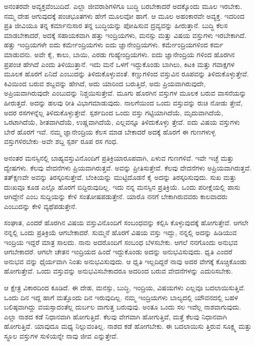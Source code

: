 ಅನಂತರವೇ ಅವ್ಯಕ್ತವೆಂಬುದಿದೆ. ಎಲ್ಲಾ ಜೀವರಾಶಿಗಳಿಗೂ ಬುದ್ಧಿ ಬರಬೇಕಾದರೆ ಅದಕ್ಕೊಂದು ಮೂಲ ಇರಬೇಕು. ನಮ್ಮ ದೇಹ ಆಗುವುದಕ್ಕೆ ಪಂಚಭೂತಗಳು ಹೇಗೆ ಮೂಲವೋ ಹಾಗೆ. ಆ ಮೂಲ ಅಹಂಕಾರವೇ ಅವ್ಯಕ್ತ. ಇದರಿಂದ ಪ್ರತಿ ಜೀವಿಯೂ ತನ್ನ ಕರ್ಮಾನುಸಾರ ತನ್ನ ಬುದ್ಧಿಯನ್ನು ಪೋಷಿಸುವ ದ್ರವ್ಯವನ್ನು ಹೀರುತ್ತಾನೆ. ಬುದ್ಧಿ ಕೆಲಸ ಮಾಡಬೇಕಾದರೆ, ಅದಕ್ಕೆ ಸಹಾಯಕವಾಗಿ ಹತ್ತು ಇಂದ್ರಿಯಗಳು, ಮನಸ್ಸು ಮತ್ತು ವಿಷಯ ವಸ್ತುಗಳು ಇರಬೇಕಾಗಿದೆ. ಹತ್ತು ಇಂದ್ರಿಯಗಳೇ ಐದು ಕರ್ಮೇಂದ್ರಿಯಗಳು ಐದು ಜ್ಞಾನೇಂದ್ರಿಯಗಳು. ಕರ್ಮೇಂದ್ರಿಯಗಳಿಂದ ಕರ್ಮ ಮಾಡುವನು. ಅವೇ ಕೈ, ಕಾಲು, ಬಾಯಿ, ಎರಡು ಗುಹ್ಯೇಂದ್ರಿಯಗಳು. ಐದು ಜ್ಞಾನೇಂದ್ರಿಯ ಗಳಿಂದ ಹೊರಗಿನ ಪ್ರಪಂಚ ಹೇಗಿದೆ ಎಂದು ತಿಳಿಯುತ್ತಾನೆ. ಇದು ಮನೆ ಒಳಗೆ ಇದ್ದುಕೊಂಡು ಬಾಗಿಲು, ಕಿಟಕಿ ಮತ್ತು ಗವಾಕ್ಷಗಳ ಮೂಲಕ ಹೊರಗೆ ಏನಿದೆ ಎಂಬುದನ್ನು ತಿಳಿದುಕೊಳ್ಳುವಂತೆ. ಕಣ್ಣುಗಳಿಂದ ವಸ್ತುವಿನ ರೂಪವನ್ನು ತಿಳಿದುಕೊಳ್ಳುತ್ತೇವೆ. ಕಿವಿಯಿಂದ ಬರುವ ಶಬ್ದವನ್ನು ಹೇಗಿದೆ, ಅದು ಯಾರಿಂದ ಬರುತ್ತಿದೆ, ಅದು ಪ್ರಿಯವಾಗಿರುವುದೇ, ಅಪ್ರಿಯವಾಗಿರುವುದೇ ಎಂಬುದನ್ನು ನಿಶ್ಚಯಿಸುತ್ತೇವೆ. ಮೂಗು ಹೊರಗಿನ ವಸ್ತುಗಳ ಮೂಲಕ ಬರುವ ವಾಸನೆಯನ್ನು ಹೀರುತ್ತದೆ. ಅದನ್ನು ಹಲವು ರೀತಿ ವಿಭಾಗಮಾಡುವುದು. ನಾಲಗೆಯಿಂದ ಒಂದು ವಸ್ತುವನ್ನು ರುಚಿ ನೋಡು ತ್ತೇವೆ, ಅದರ ರಸಗಳನ್ನೆಲ್ಲ ತಿಳಿದುಕೊಳ್ಳುತ್ತೇವೆ. ಸ್ಪರ್ಶದಿಂದ ಒಂದು ವಸ್ತು ಗಟ್ಟಿಯಾಗಿದೆಯೆ, ಮೃದುವಾಗಿದೆಯೆ, ಒರಟಾಗಿದೆಯೆ, ಶೀತವಾಗಿದೆಯೆ, ಉಷ್ಣವಾಗಿದೆಯೆ, ಎಲ್ಲವನ್ನೂ ತಿಳಿದುಕೊಳ್ಳು ತ್ತೇವೆ. ಐದು ವಿಷಯ ವಸ್ತುಗಳು ಬೇರೆ ಹೊರಗೆ ಇವೆ. ನಮ್ಮ ಜ್ಞಾನೇಂದ್ರಿಯ ಕೆಲಸ ಮಾಡ ಬೇಕಾದರೆ ಅದಕ್ಕೆ ಹೊರಗೆ ಈ ಗುಣಗಳುಳ್ಳ ವಸ್ತುಗಳಿರಬೇಕು–ಅವೇ ಶಬ್ದ ಸ್ಪರ್ಶ ರೂಪ ರಸ ಗಂಧ.

ಅನಂತರ ಮನಸ್ಸಿನಲ್ಲಿ ಬಾಹ್ಯವಸ್ತುವಿನೊಂದಿಗೆ ಪ್ರತಿಕ್ರಿಯಾರೂಪವಾಗಿ, ಏಳುವ ಗುಣಗಳಿವೆ. ಇವೇ ಇಚ್ಛೆ ಮತ್ತು ದ್ವೇಷಗಳು. ಕೆಲವು ವೇದನೆಗಳು ಪ್ರಿಯವಾಗಿರುತ್ತವೆ. ಅವನ್ನು ಪ್ರೀತಿಸುತ್ತೇವೆ. ಕೆಲವು ವೇದನೆಗಳು ಅಪ್ರಿಯವಾಗಿರುತ್ತವೆ. ತತ್​ಕ್ಷಣವೇ ಅವನ್ನು ತಿರಸ್ಕರಿಸುತ್ತೇವೆ. ಬೆಂಕಿಯನ್ನು ಮುಟ್ಟಿದೊಡನೆ ಕೈ ಅದನ್ನು ತಿರಸ್ಕರಿಸುವುದು. ಸುಖ ಮತ್ತು ದುಃಖವೂ ಕೂಡ ಎಲ್ಲೊ ಹೊರಗೆ ಬಿದ್ದಿರುವುದಿಲ್ಲ. ಇದು ನನ್ನ ಮನಸ್ಸಿನ ಪ್ರತಿಕ್ರಿಯೆ. ಒಂದು ಪರೀಕ್ಷೆಯಲ್ಲಿ ಪಾಸು ಆಗಿದ್ದೇನೆ ಎಂಬ ಸುದ್ದಿಯನ್ನು ಕೇಳಿ ಸಂತೋಷಪಡುತ್ತೇನೆ. ಯಾರೊ ನನಗೆ ಬೇಕಾಗಿರುವವರು ಕಾಲವಾದರು ಎಂಬುದನ್ನು ಕೇಳಿ ವ್ಯಥೆಪಡುತ್ತೇನೆ.

ಸಂಘಾತ, ಎಂದರೆ ಹೊರಗಿನ ವಿಷಯ ವಸ್ತುವಿನೊಂದಿಗೆ ಸಂಬಂಧವನ್ನು ಕಲ್ಪಿಸಿ ಕೊಳ್ಳುವುದಕ್ಕೆ ಹೋಗುತ್ತೇವೆ. ಆಗಲೇ ನನ್ನಲ್ಲಿ ಒಂದು ಪ್ರತಿಕ್ರಿಯೆ ಆಗಬೇಕಾದರೆ. ಸುಮ್ಮನೆ ಹೊರಗೆ ವಿಷಯ ವಸ್ತು ಇದ್ದು, ನನ್ನಲ್ಲಿ ಅದನ್ನು ಹಿಡಿಯುವ ಇಂದ್ರಿಯ ಇದ್ದರೆ ಮಾತ್ರ ಸಾಲದು. ನಾನು ಅದರೊಂದಿಗೆ ಸಂಬಂಧ ಬೆಳಸಬೇಕು. ಆಗಲೆ ನನಗೊಂದು ಅನುಭವ ಆಗಬೇಕಾದರೆ. ಆಗಲೇ ಚೇತನ ಇಂದ್ರಿಯದ ಹಿಂದೆ ಇದ್ದುಕೊಂಡು ಅದನ್ನು ಅನುಭವಿಸುವುದು. ಧೃತಿ ಎಂದರೆ ಅನುಭವ ವನ್ನು ಧೈರ್ಯವಾಗಿ ನಿಂತು ಅನುಭವಿಸುವುದು. ಆ ಧೃತಿ ಇಲ್ಲದಿದ್ದರೆ ನಾವು ಅದರ ವೇಗಕ್ಕೆ ಕೊಚ್ಚಿಕೊಂಡು ಹೋಗುತ್ತೇವೆ. ಒಂದು ವಸ್ತುವನ್ನು ಅನುಭವಿಸಬೇಕಾದರೂ ಅದರಿಂದ ಬರುವ ವೇದನೆಗಳನ್ನು ಎದುರಿಸಬೇಕು.

ಆ ಕ್ಷೇತ್ರ ವಿಕಾರದಿಂದ ಕೂಡಿದೆ. ಈ ದೇಹ, ಮನಸ್ಸು, ಬುದ್ಧಿ, ಇಂದ್ರಿಯ, ವಿಷಯಗಳು ಎಲ್ಲವೂ ಬದಲಾಯಿಸುತ್ತಿವೆ. ಒಂದು ದಿನ ಇದ್ದ ಹಾಗೆ ಮತ್ತೊಂದು ದಿನ ಇರುವುದಿಲ್ಲ. ನಮ್ಮ ಇಂದ್ರಿಯಗಳು ಬಾಲ್ಯದಲ್ಲಿ ಯೌವನದಲ್ಲಿ ಬಹಳ ಬಲಿಷ್ಠವಾಗಿದ್ದು ವಯಸ್ಸಾದಂತೆಲ್ಲ ದುರ್ಬಲ ವಾಗುತ್ತ ಬರುವುವು. ಅಂತೂ ಒಂದು ಸಲ ಇವೆಲ್ಲ ನಾಶವಾಗುವುದು. ಎಲ್ಲಾ ನಾಶದ ಕಡೆ ನಿಧಾನವಾಗಿ ಹೋಗುತ್ತಿದೆ. ಕೆಲವು ವೇಗವಾಗಿ ಹೋಗುತ್ತಿವೆ, ಮತ್ತೆ ಕೆಲವು ನಿಧಾನವಾಗಿ ಹೋಗುತ್ತಿವೆ. ಯಾವುದೂ ಮಧ್ಯ ನಿಲ್ಲುವಂತಿಲ್ಲ. ನಾಶದ ಕಡೆ ಹೋಗಬೇಕು. ಈ ಬದಲಾಯಿಸು ತ್ತಿರುವ ಸೂಕ್ಷ್ಮ ಮತ್ತು ಸ್ಥೂಲ ವಸ್ತುಗಳ ಸುಳಿಯನ್ನೇ ನಾವು ಜೀವ ಎನ್ನುತ್ತೇವೆ.


